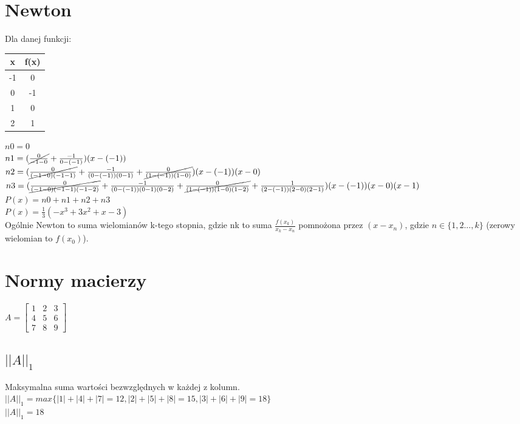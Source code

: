 \documentclass{article}
\begin{document}
\section{Newton}
Dla danej funkcji:
\begin{table}[H]
\begin{tabular}{|c|c|}
\hline
x  & f(x) \\ \hline
-1 & 0    \\ \hline
0  & -1   \\ \hline
1  & 0    \\ \hline
2  & 1    \\ \hline
\end{tabular}%
\end{table}
$n0=0$\\
$n1=(\cancel{\frac{0}{-1-0}} + \frac{-1}{0- (-1)})(x-(-1))$\\
$n2=(\cancel{\frac{0}{(-1-0)(-1-1)}}+\frac{-1}{(0-(-1))(0-1)}+\cancel{\frac{0}{(1-(-1))(1-0)}})(x-(-1))(x-0)$\\
$n3=(\cancel{\frac{0}{(-1-0)(-1-1)(-1-2)}}+\frac{-1}{(0-(-1))(0-1)(0-2)}+\cancel{\frac{0}{(1-(-1))(1-0)(1-2)}}+\frac{1}{(2-(-1))(2-0)(2-1)})(x-(-1))(x-0)(x-1)$\\
$P(x)=n0+n1+n2+n3$\\
$P(x)=\frac{1}{3}(-x^3+3x^2+x-3)$\\
Ogólnie Newton to suma wielomianów k-tego stopnia, gdzie nk to suma $\frac{f(x_k)}{x_k-x_n}$ pomnożona przez $(x-x_n)$, gdzie $n \in \{1,2...,k\}$ (zerowy wielomian to $f(x_0)$).

\section{Normy macierzy}
$A=\begin{bmatrix} 1 & 2 & 3 \\ 4 & 5 & 6 \\ 7 & 8 & 9 \end{bmatrix}$\\
\subsection{$||A||_1$}
Maksymalna suma wartości bezwzględnych w każdej z kolumn.\\
$||A||_1=max\{|1|+|4|+|7|=12, |2|+|5|+|8|=15, |3|+|6|+|9|=18\}$\\
$||A||_1=18$
\end{document}
